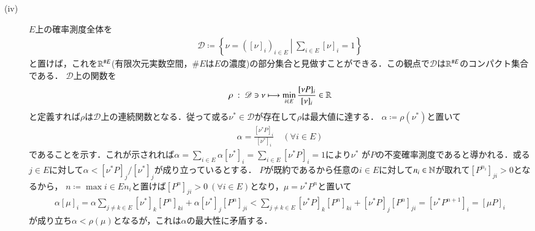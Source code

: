 \begin{prf}
\begin{description}
			\item[\rm{(iv)}]
				$E$上の確率測度全体を
				\begin{align}
					\mathscr{D} \coloneqq \left\{ \nu=([\nu]_i)_{i \in E}\ \left|\ \sum_{i \in E}[\nu]_i = 1 \right.\right\}
				\end{align}
				と置けば，これを$\mathbb{R}^{\# E}$(有限次元実数空間，$\# E$は$E$の濃度)の部分集合と見做すことができる．この観点で$\mathscr{D}$は$\mathbb{R}^{\# E}$のコンパクト集合である．
				$\mathscr{D}$上の関数を
				\begin{align}
					\rho\ :\ \mathscr{D} \ni \nu \longmapsto \operatorname*{min}_{i \in E} \frac{[\nu P]_i}{[\nu]_i} \in \mathbb{R}
				\end{align}
				と定義すれば$\rho$は$\mathscr{D}$上の連続関数となる．従って或る$\nu^* \in \mathscr{D}$が存在して$\rho$は最大値に達する．
				$\alpha \coloneqq \rho(\nu^*)$と置いて
				\begin{align}
					\alpha = \frac{[\nu^* P]_i}{[\nu^*]_i}\quad (\forall i \in E)
				\end{align}
				であることを示す．これが示されれば$\alpha = \sum_{i \in E} \alpha [\nu^*]_i = \sum_{i \in E} [\nu^* P]_i = 1$により$\nu^*$
				が$P$の不変確率測度であると導かれる．或る$j \in E$に対して$\alpha < [\nu^* P]_j/[\nu^*]_j$が成り立っているとする．
				$P$が既約であるから任意の$i \in E$に対して$n_i \in \mathbb{N}$が取れて$[P^{n_i}]_{ji} > 0$となるから，
				$n \coloneqq \max{i \in E}{n_i}$と置けば$[P^n]_{ji} > 0\ (\forall i \in E)$となり，$\mu = \nu^* P^n$と置いて
				\begin{align}
					\alpha [\mu]_i = \alpha \sum_{j \neq k \in E} [\nu^*]_k [P^{n}]_{ki} + \alpha [\nu^*]_j [P^{n}]_{ji} 
					< \sum_{j \neq k \in E} [\nu^* P]_{k} [P^{n}]_{ki} + [\nu^* P]_j [P^{n}]_{ji} = [\nu^* P^{n + 1}]_i = [\mu P]_i
				\end{align}
				が成り立ち$\alpha < \rho(\mu)$となるが，これは$\alpha$の最大性に矛盾する．
		\end{description}
	\end{prf}

